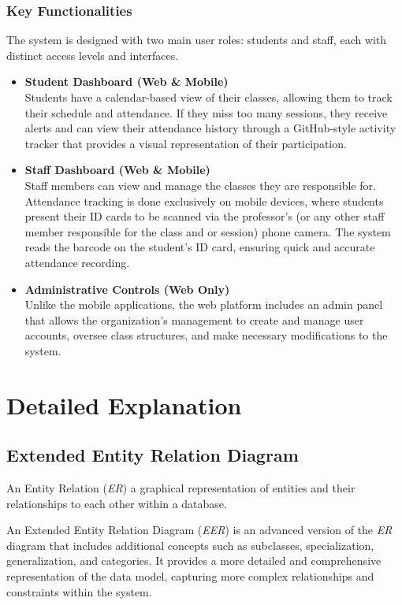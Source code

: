 \documentclass[a4paper, 12pt]{article}
\begin{document}
      \subsubsection{Key Functionalities}
      The system is designed with two main user roles: students and staff, each with distinct access levels and interfaces.
      \begin{itemize}
        \item \textbf{Student Dashboard (Web \& Mobile)} \\
        Students have a calendar-based view of their classes, allowing them to track their schedule and attendance. If they miss too many sessions, they receive alerts and can view their attendance history through a GitHub-style activity tracker that provides a visual representation of their participation.
        \item \textbf{Staff Dashboard (Web \& Mobile)} \\
        Staff members can view and manage the classes they are responsible for. Attendance tracking is done exclusively on mobile devices, where students present their ID cards to be scanned via the professor's (or any other staff member responsible for the class and or session) phone camera. The system reads the barcode on the student’s ID card, ensuring quick and accurate attendance recording.
        \item \textbf{Administrative Controls (Web Only)} \\
        Unlike the mobile applications, the web platform includes an admin panel that allows the organization's management to create and manage user accounts, oversee class structures, and make necessary modifications to the system.
      \end{itemize}

    \newpage
  \section{Detailed Explanation}

    \subsection{Extended Entity Relation Diagram} \label{sec: EER}
      An Entity Relation (\emph{ER}) a graphical representation of entities and their relationships to each other within a database. \newline

      An Extended Entity Relation Diagram (\emph{EER}) is an advanced version of the \emph{ER} diagram that includes additional 
      concepts such as subclasses, specialization, generalization, and categories. It provides a more detailed and comprehensive 
      representation of the data model, capturing more complex relationships and constraints within the system. \newline
\end{document}
